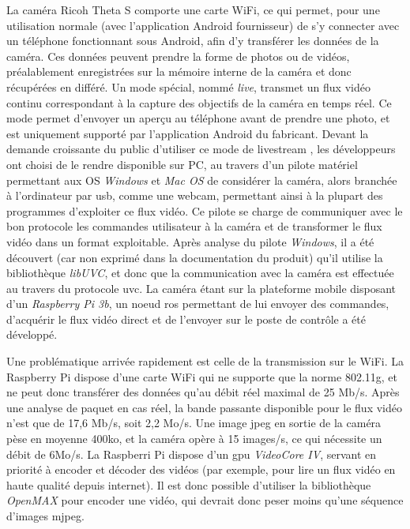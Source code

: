 			La caméra Ricoh Theta S comporte une carte WiFi, ce qui permet, pour une utilisation \og normale \fg{} (avec l'application Android fournisseur) de s'y connecter avec un téléphone fonctionnant sous Android, afin d'y transférer les données de la caméra. Ces données peuvent prendre la forme de photos ou de vidéos, préalablement enregistrées sur la mémoire interne de la caméra et donc récupérées en différé. Un mode spécial, nommé \emph{live}, transmet un flux vidéo continu correspondant à la capture des objectifs de la caméra en temps réel. Ce mode permet d'envoyer un aperçu au téléphone avant de prendre une photo, et est uniquement supporté par l'application Android du fabricant. Devant la demande croissante du public d'utiliser ce mode de \og livestream \fg{}, les développeurs ont choisi de le rendre disponible sur PC, au travers d'un pilote matériel permettant aux OS \emph{Windows} et \emph{Mac OS} de considérer la caméra, alors branchée à l'ordinateur par \gls{usb}, comme une webcam, permettant ainsi à la plupart des programmes d'exploiter ce flux vidéo. Ce pilote se charge de communiquer avec le bon protocole les commandes utilisateur à la caméra et de transformer le flux vidéo dans un format exploitable. Après analyse du pilote \emph{Windows}, il a été découvert (car non exprimé dans la documentation du produit) qu'il utilise la bibliothèque \emph{libUVC}, et donc que la communication avec la caméra est effectuée au travers du protocole \gls{uvc}. La caméra étant sur la plateforme mobile disposant d'un \emph{Raspberry Pi 3b}, un noeud \gls{ros} permettant de lui envoyer des commandes, d'acquérir le flux vidéo direct et de l'envoyer sur le poste de contrôle a été développé.
			\par
			Une problématique arrivée rapidement est celle de la transmission sur le WiFi.
			La Raspberry Pi dispose d'une carte WiFi qui ne supporte que la norme 802.11g, et ne peut donc transférer des données qu'au débit réel maximal de 25 Mb/s.
			Après une analyse de paquet en cas réel, la bande passante disponible pour le flux vidéo n'est que de 17,6 Mb/s, soit 2,2 Mo/s.
			Une image \gls{jpeg} en sortie de la caméra pèse en moyenne 400ko, et la caméra opère à 15 images/s, ce qui nécessite un débit de 6Mo/s.
			La Raspberri Pi dispose d'un \gls{gpu} \emph{VideoCore IV}\cite{videocore}, servant en priorité à encoder et décoder des vidéos (par exemple, pour lire un flux vidéo en haute qualité depuis internet).
			Il est donc possible d'utiliser la bibliothèque \emph{OpenMAX} pour encoder une vidéo, qui devrait donc peser moins qu'une séquence d'images \gls{mjpeg}.
